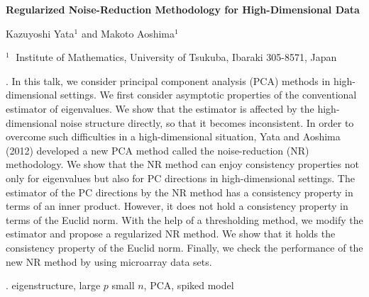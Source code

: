 \documentclass[12pt]{article}
\begin{document}
\begin{flushleft}


{\LARGE\bf 
Regularized Noise-Reduction Methodology for High-Dimensional Data
}


\vspace{1.0cm}

Kazuyoshi Yata$^1$ and Makoto Aoshima$^1$

\begin{description}

\item $^1 \;$
Institute of Mathematics, University of Tsukuba, 
Ibaraki 305-8571, Japan

\end{description}

\end{flushleft}


\vspace{0.75cm}

. 
In this talk, we consider principal component analysis (PCA) methods in high-dimensional settings. We first consider asymptotic properties of the conventional estimator of eigenvalues. We show that the estimator is affected by the high-dimensional noise structure directly, so that it becomes inconsistent. In order to overcome such difficulties in a high-dimensional situation, Yata and Aoshima (2012) developed a new PCA method called the noise-reduction (NR) methodology. We show that the NR method can enjoy consistency properties not only for eigenvalues but also for PC directions in high-dimensional settings. The estimator of the PC directions by the NR method has a consistency property in terms of an inner product. However, it does not hold a consistency property in terms of the Euclid norm. With the help of a thresholding method, we modify the estimator and propose a regularized NR method. We show that it holds the consistency property of the Euclid norm. Finally, we check the performance of the new NR method by using microarray data sets. 
\vskip 2mm

.
eigenstructure, large $p$ small $n$, PCA, spiked model
\end{document}
